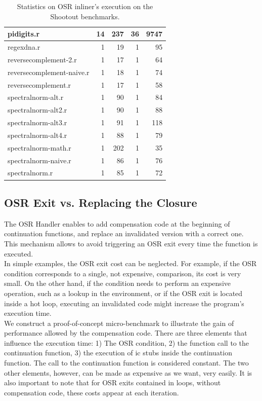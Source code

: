 \begin{table}[h!]
{\begin{tabular}{|l|r|r|r|r|}
pidigits.r & 14 & 237 & 36 & 9747\\ \hline
regexdna.r & 1 & 19 & 1 & 95\\ \hline
reversecomplement-2.r & 1 & 17 & 1 & 64\\ \hline
reversecomplement-naive.r  & 1 & 18 & 1 & 74\\ \hline
reversecomplement.r & 1 & 17 & 1 & 58\\ \hline
spectralnorm-alt.r  & 1 & 90 & 1 & 84\\ \hline
spectralnorm-alt2.r & 1 & 90 & 1 & 88\\ \hline
spectralnorm-alt3.r & 1 & 91 & 1 & 118\\ \hline
spectralnorm-alt4.r & 1 & 88 & 1 & 79\\ \hline
spectralnorm-math.r & 1 & 202 & 1 & 35\\ \hline
spectralnorm-naive.r & 1 & 86 & 1 & 76\\ \hline
spectralnorm.r & 1 & 85 & 1 & 72\\ \hline

\end{tabular}}%
\caption{Statistics on OSR inliner's execution on the Shootout benchmarks.}
\label{tab:statsinliner}
\end{table}
\clearpage



\subsection{OSR Exit vs. Replacing the Closure}\label{section:osrexitsvsreplacing}
The OSR Handler enables to add compensation code at the beginning of continuation functions, and replace an invalidated version with a correct one.
This mechanism allows to avoid triggering an OSR exit every time the function is executed.\\

In simple examples, the OSR exit cost can be neglected.
For example, if the OSR condition corresponds to a single, not expensive, comparison, its cost is very small.
On the other hand, if the condition needs to perform an expensive operation, such as a lookup in the environment, or if the OSR exit is located inside a hot loop, executing an invalidated code might increase the program's execution time.\\

We construct a proof-of-concept micro-benchmark to illustrate the gain of performance allowed by the compensation code. 
There are three elements that influence the execution time: 1) The OSR condition, 2) the function call to the continuation function, 3) the execution of ic stubs inside the continuation function.
The call to the continuation function is considered constant.
The two other elements, however, can be made as expensive as we want, very easily.
It is also important to note that for OSR exits contained in loops, without compensation code, these costs appear at each iteration.\\

